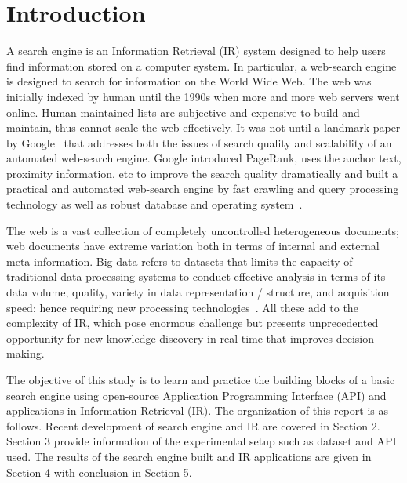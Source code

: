 \documentclass{sig-alternate-05-2015}
\begin{document}

%
%

%
%
\printccsdesc



\section{Introduction}
A search engine is an Information Retrieval (IR) system designed to help users find information stored on a computer system. In particular, a web-search engine is designed to search for information on the World Wide Web. The web was initially indexed by human until the 1990s when more and more web servers went online. Human-maintained lists are subjective and expensive to build and maintain, thus cannot scale the web effectively. It was not until a landmark paper by Google~\cite{Brin2012} that addresses both the issues of search quality and scalability of an automated web-search engine. Google introduced PageRank, uses the anchor text, proximity information, etc to improve the search quality dramatically and built a practical and automated web-search engine by fast crawling and query processing technology as well as robust database and operating system~\cite{Brin2012}.  

The web is a vast collection of completely uncontrolled heterogeneous documents; web documents have extreme variation both in terms of internal and external meta information. Big data refers to datasets that limits the capacity of traditional data processing systems to conduct effective analysis in terms of its data volume, quality, variety in data representation / structure, and acquisition speed; hence requiring new processing technologies~\cite{Chen2014}. All these add to the complexity of IR, which pose enormous challenge but presents unprecedented opportunity for new knowledge discovery in real-time that improves decision making. 

The objective of this study is to learn and practice the building blocks of a basic search engine using open-source Application Programming Interface (API) and applications in Information Retrieval (IR). The organization of this report is as follows. Recent development of search engine and IR are covered in Section 2. Section 3 provide information of the experimental setup such as dataset and API used. The results of the search engine built and IR applications are given in Section 4 with conclusion in Section 5.
\end{document}
